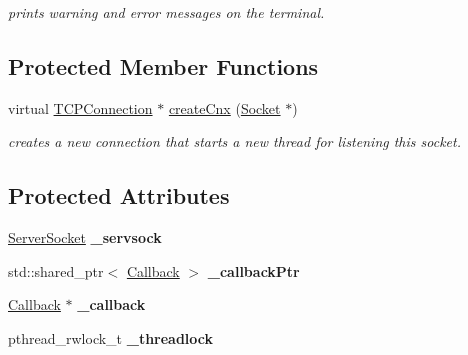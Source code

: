 \begin{DoxyCompactItemize}
\begin{DoxyCompactList}\small\item\em prints warning and error messages on the terminal. \end{DoxyCompactList}\end{DoxyCompactItemize}
\subsection*{Protected Member Functions}
\begin{DoxyCompactItemize}
\item 
virtual \hyperlink{classcppu_1_1TCPConnection}{T\+C\+P\+Connection} $\ast$ \hyperlink{classcppu_1_1TCPServer_abe314b95a31c88b479c81ec9bf123c65}{create\+Cnx} (\hyperlink{classcppu_1_1Socket}{Socket} $\ast$)\hypertarget{classcppu_1_1TCPServer_abe314b95a31c88b479c81ec9bf123c65}{}\label{classcppu_1_1TCPServer_abe314b95a31c88b479c81ec9bf123c65}

\begin{DoxyCompactList}\small\item\em creates a new connection that starts a new thread for listening this socket. \end{DoxyCompactList}\end{DoxyCompactItemize}
\subsection*{Protected Attributes}
\begin{DoxyCompactItemize}
\item 
\hyperlink{classcppu_1_1ServerSocket}{Server\+Socket} {\bfseries \+\_\+servsock}\hypertarget{classcppu_1_1TCPServer_a8e4422abf23dc5bd195d05a3e9eee167}{}\label{classcppu_1_1TCPServer_a8e4422abf23dc5bd195d05a3e9eee167}

\item 
std\+::shared\+\_\+ptr$<$ \hyperlink{structcppu_1_1TCPServer_1_1Callback}{Callback} $>$ {\bfseries \+\_\+callback\+Ptr}\hypertarget{classcppu_1_1TCPServer_abe36d427d7b047cdd342e282611c841e}{}\label{classcppu_1_1TCPServer_abe36d427d7b047cdd342e282611c841e}

\item 
\hyperlink{structcppu_1_1TCPServer_1_1Callback}{Callback} $\ast$ {\bfseries \+\_\+callback}\hypertarget{classcppu_1_1TCPServer_a68940bd70ac6941ca49d1e51b631f5e9}{}\label{classcppu_1_1TCPServer_a68940bd70ac6941ca49d1e51b631f5e9}

\item 
pthread\+\_\+rwlock\+\_\+t {\bfseries \+\_\+threadlock}\hypertarget{classcppu_1_1TCPServer_aea2dbb4b5762044217096e52cd559b97}{}\label{classcppu_1_1TCPServer_aea2dbb4b5762044217096e52cd559b97}

\end{DoxyCompactItemize}
